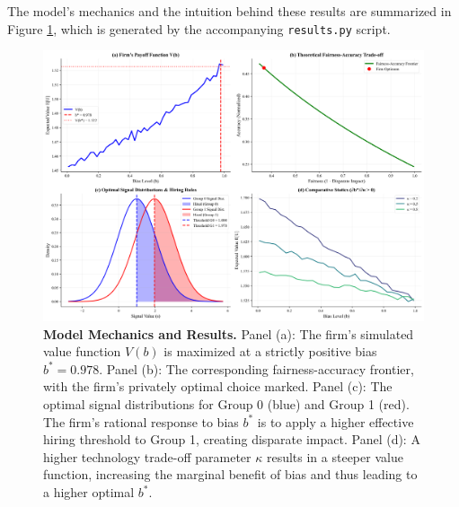 The model's mechanics and the intuition behind these results are summarized in Figure \ref{fig:main_results}, which is generated by the accompanying \texttt{results.py} script.

\begin{figure}[H]
    \centering
    \includegraphics[width=\textwidth]{../figures/figure_1_model_mechanics.png}
    \caption[Model Mechanics and Results]{\textbf{Model Mechanics and Results.} 
    Panel (a): The firm's simulated value function $V(b)$ is maximized at a strictly positive bias $b^*=0.978$. 
    Panel (b): The corresponding fairness-accuracy frontier, with the firm's privately optimal choice marked. 
    Panel (c): The optimal signal distributions for Group 0 (blue) and Group 1 (red). The firm's rational response to bias $b^*$ is to apply a higher effective hiring threshold to Group 1, creating disparate impact.
    Panel (d): A higher technology trade-off parameter $\kappa$ results in a steeper value function, increasing the marginal benefit of bias and thus leading to a higher optimal $b^*$.}
    \label{fig:main_results}
\end{figure}